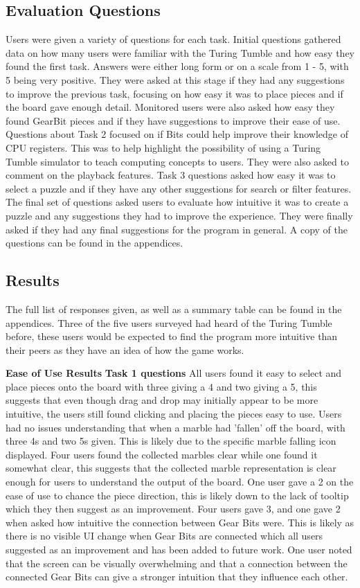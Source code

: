 \documentclass{l4proj}
\begin{document}
\subsection{Evaluation Questions}
Users were given a variety of questions for each task. Initial questions gathered data on how many users were familiar with the Turing Tumble and how easy they found the first task. Answers were either long form or on a scale from 1 - 5, with 5 being very positive. They were asked at this stage if they had any suggestions to improve the previous task, focusing on how easy it was to place pieces and if the board gave enough detail. Monitored users were also asked how easy they found GearBit pieces and if they have suggestions to improve their ease of use. Questions about Task 2 focused on if Bits could help improve their knowledge of CPU registers. This was to help highlight the possibility of using a Turing Tumble simulator to teach computing concepts to users. They were also asked to comment on the playback features. Task 3 questions asked how easy it was to select a puzzle and if they have any other suggestions for search or filter features. The final set of questions asked users to evaluate how intuitive it was to create a puzzle and any suggestions they had to improve the experience. They were finally asked if they had any final suggestions for the program in general. A copy of the questions can be found in the appendices.

\subsection{Results}
The full list of responses given, as well as a summary table can be found in the appendices. Three of the five users surveyed had heard of the Turing Tumble before, these users would be expected to find the program more intuitive than their peers as they have an idea of how the game works.

\textbf{Ease of Use Results}
\textbf{Task 1 questions}
All users found it easy to select and place pieces onto the board with three giving a 4 and two giving a 5, this suggests that even though drag and drop may initially appear to be more intuitive, the users still found clicking and placing the pieces easy to use. Users had no issues understanding that when a marble had 'fallen' off the board, with three 4s and two 5s given. This is likely due to the specific marble falling icon displayed. Four users found the collected marbles clear while one found it somewhat clear, this suggests that the collected marble representation is clear enough for users to understand the output of the board.  One user gave a 2 on the ease of use to chance the piece direction, this is likely down to the lack of tooltip which they then suggest as an improvement. Four users gave 3, and one gave 2 when asked how intuitive the connection between Gear Bits were. This is likely as there is no visible UI change when Gear Bits are connected which all users suggested as an improvement and has been added to future work. One user noted that the screen can be visually overwhelming and that a connection between the connected Gear Bits can give a stronger intuition that they influence each other. 
\end{document}
